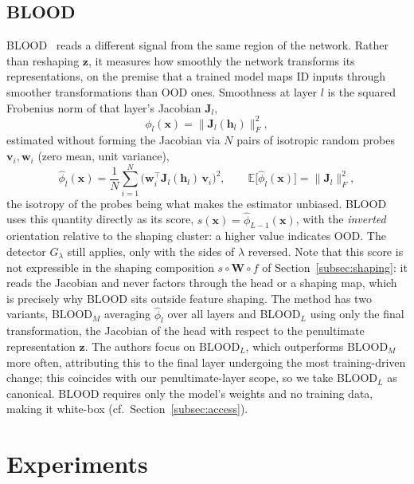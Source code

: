 \documentclass[a4paper]{article}
\begin{document}
\subsection{BLOOD}
\label{subsec:blood}

BLOOD~\citep{blood} reads a different signal from the same region of the network.
Rather than reshaping $\mathbf{z}$, it measures how smoothly the network transforms
its representations, on the premise that a trained model maps ID inputs through
smoother transformations than OOD ones. Smoothness at layer $l$ is the squared
Frobenius norm of that layer's Jacobian $\mathbf{J}_l$,
\begin{equation}
\label{eq:blood}
\phi_l(\mathbf{x}) = \big\| \mathbf{J}_l(\mathbf{h}_l) \big\|_F^{2},
\end{equation}
estimated without forming the Jacobian via $N$ pairs of isotropic random probes
$\mathbf{v}_i, \mathbf{w}_i$ (zero mean, unit variance),
\begin{equation}
\hat{\phi}_l(\mathbf{x}) = \frac{1}{N} \sum_{i=1}^{N}
\big( \mathbf{w}_i^{\top} \mathbf{J}_l(\mathbf{h}_l)\, \mathbf{v}_i \big)^{2},
\qquad
\mathbb{E}\big[\hat{\phi}_l(\mathbf{x})\big] = \big\| \mathbf{J}_l \big\|_F^{2},
\end{equation}
the isotropy of the probes being what makes the estimator unbiased. BLOOD uses this
quantity directly as its score, $s(\mathbf{x}) = \hat{\phi}_{L-1}(\mathbf{x})$, with
the \emph{inverted} orientation relative to the shaping cluster: a higher value
indicates OOD. The detector $G_\lambda$ still applies, only with the sides of
$\lambda$ reversed. Note that this score is not expressible in the
shaping composition $s \circ \mathbf{W} \circ f$ of Section~\ref{subsec:shaping}: it
reads the Jacobian and never factors through the head or a shaping map, which is
precisely why BLOOD sits outside feature shaping. The method has two variants,
BLOOD$_M$ averaging $\hat{\phi}_l$ over all layers and BLOOD$_L$ using only the final
transformation, the Jacobian of the head with respect to the penultimate
representation $\mathbf{z}$. The authors focus on BLOOD$_L$, which outperforms
BLOOD$_M$ more often, attributing this to the final layer undergoing the most
training-driven change; this coincides with our penultimate-layer scope, so we take
BLOOD$_L$ as canonical. BLOOD requires only the model's weights and no training data,
making it white-box (cf.\ Section~\ref{subsec:access}).



\section{Experiments}
\label{sec:experiments}
\end{document}
